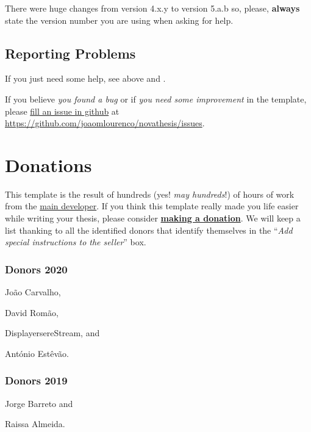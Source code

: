 There were huge changes from version 4.x.y to version 5.a.b so, please, \textbf{always} state the version number you are using when asking for help.

\subsection{Reporting Problems}
\label{sub:reporting_problems}

If you just need some help, see above  and .

If you believe \emph{you found a bug} or if \emph{you need some improvement} in the template, please \href{https://github.com/joaomlourenco/novathesis/issues}{fill an issue in github} at \url{https://github.com/joaomlourenco/novathesis/issues}.


\section{Donations}
\label{sec:donations}

This template is the result of hundreds (yes! \emph{may hundreds}!) of hours of work from the \href{https://docentes.fct.unl.pt/joao-lourenco}{main developer}.  If you think this template really made you life easier while writing your thesis, please consider \href{https://paypal.me/novathesis}{\textbf{making a donation}}. We will keep a list thanking to all the identified donors that identify themselves in the “\emph{Add special instructions to the seller}” box.

\subsubsection*{Donors 2020}
\label{ssub:donors_2020}

\begin{inparaitem}[]
  \item João Carvalho, 
  \item David Romão, 
  \item DisplayersereStream, and
  \item António Estêvão.  
\end{inparaitem}

\subsubsection*{Donors 2019}
\label{ssub:donors_2019}

\begin{inparaitem}[]
  \item Jorge Barreto and
  \item Raissa Almeida.  
\end{inparaitem}




